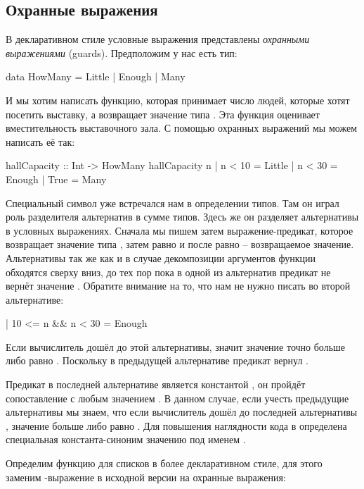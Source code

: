 \subsection{Охранные выражения}

В декларативном стиле условные выражения представлены 
\emph{охранными выражениями} (guards). Предположим у нас есть
тип:

\begin{code}
data HowMany = Little | Enough | Many
\end{code}

И мы хотим написать функцию, которая принимает число людей,
которые хотят посетить выставку, а возвращает значение 
типа . Эта функция оценивает вместительность
выставочного зала. С помощью охранных выражений мы можем написать
её так:

\begin{code}
hallCapacity :: Int -> HowMany
hallCapacity n
    | n < 10    = Little
    | n < 30    = Enough
    | True      = Many
\end{code}

Специальный символ \In{|} уже встречался нам в определении
типов. Там он играл роль разделителя альтернатив в сумме типов.
Здесь же он разделяет альтернативы в условных выражениях. 
Сначала мы пишем \In{|} затем выражение-предикат, которое
возвращает значение типа , затем
равно и после равно -- возвращаемое значение. Альтернативы
так же как и в случае декомпозиции аргументов функции обходятся
сверху вниз, до тех пор пока в одной из альтернатив предикат 
не вернёт значение . Обратите внимание на то, что нам 
не нужно писать во второй альтернативе:

\begin{code}
    | 10 <= n && n < 30   = Enough
\end{code}

Если вычислитель дошёл до этой альтернативы, значит значение
точно больше либо равно . Поскольку в предыдущей альтернативе
предикат вернул . 

Предикат в последней альтернативе 
является константой , он пройдёт сопоставление с любым
значением . В данном случае, если учесть предыдущие альтернативы
мы знаем, что если вычислитель дошёл до последней альтернативы , значение
 больше либо равно . Для повышения наглядности кода
в  определена специальная константа-синоним значению 
 под именем . 

Определим функцию  для списков в более 
декларативном стиле, для этого заменим -выражение
в исходной версии на охранные выражения:


